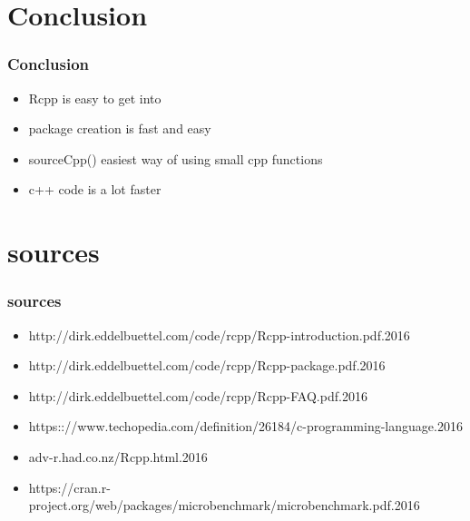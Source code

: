 \documentclass[hyperef={
    colorlinks=true,
    linkcolor=blue,
    filecolor=black,
urlcolor=blue}
]{beamer}
\begin{document}
\section{Conclusion}
\begin{frame}
\frametitle{Conclusion}
\begin{itemize}
\item Rcpp is easy to get into
\item package creation is fast and easy
\item sourceCpp() easiest way of using small
      cpp functions
\item c++ code is a lot faster
    
\end{itemize}
\end{frame}

\section{sources}
\begin{frame}
\frametitle{sources}
\begin{itemize}
\item http://dirk.eddelbuettel.com/code/rcpp/Rcpp-introduction.pdf.2016
\item http://dirk.eddelbuettel.com/code/rcpp/Rcpp-package.pdf.2016
\item http://dirk.eddelbuettel.com/code/rcpp/Rcpp-FAQ.pdf.2016
\item https:://www.techopedia.com/definition/26184/c-programming-language.2016
\item adv-r.had.co.nz/Rcpp.html.2016
\item https://cran.r-project.org/web/packages/microbenchmark/microbenchmark.pdf.2016
\end{itemize}
\end{frame}
\end{document}
